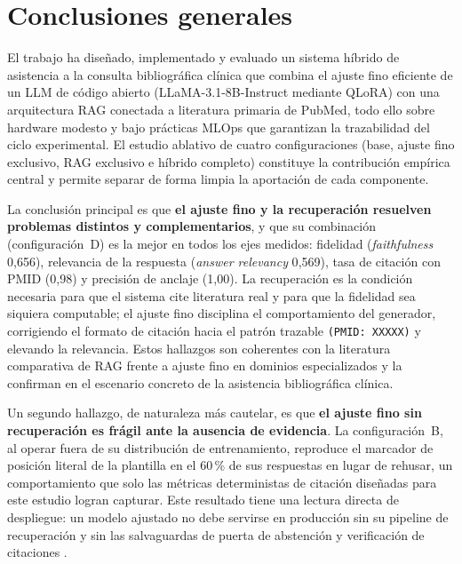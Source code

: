 \documentclass[11pt,a4paper,spanish]{book}
\numberwithin{equation}{chapter}
\numberwithin{figure}{chapter}
\begin{document}
\section{Conclusiones generales}
\label{sec:c7_conclusiones}

El trabajo ha diseñado, implementado y evaluado un sistema híbrido de asistencia a la consulta bibliográfica clínica que combina el ajuste fino eficiente de un LLM de código abierto (LLaMA-3.1-8B-Instruct mediante QLoRA) con una arquitectura RAG conectada a literatura primaria de PubMed, todo ello sobre hardware modesto y bajo prácticas MLOps que garantizan la trazabilidad del ciclo experimental. El estudio ablativo de cuatro configuraciones (base, ajuste fino exclusivo, RAG exclusivo e híbrido completo) constituye la contribución empírica central y permite separar de forma limpia la aportación de cada componente.

La conclusión principal es que \textbf{el ajuste fino y la recuperación resuelven problemas distintos y complementarios}, y que su combinación (configuración~D) es la mejor en todos los ejes medidos: fidelidad (\textit{faithfulness} 0{,}656), relevancia de la respuesta (\textit{answer relevancy} 0{,}569), tasa de citación con PMID (0{,}98) y precisión de anclaje (1{,}00). La recuperación es la condición necesaria para que el sistema cite literatura real y para que la fidelidad sea siquiera computable; el ajuste fino disciplina el comportamiento del generador, corrigiendo el formato de citación hacia el patrón trazable \texttt{(PMID:~XXXXX)} y elevando la relevancia. Estos hallazgos son coherentes con la literatura comparativa de RAG frente a ajuste fino en dominios especializados \cite{ovadia2024finetuningretrievalcomparingknowledge, balaguer2024ragvsfinetuningpipelines, pingua_medical_FT_vs_RAG_2025} y la confirman en el escenario concreto de la asistencia bibliográfica clínica.

Un segundo hallazgo, de naturaleza más cautelar, es que \textbf{el ajuste fino sin recuperación es frágil ante la ausencia de evidencia}. La configuración~B, al operar fuera de su distribución de entrenamiento, reproduce el marcador de posición literal de la plantilla en el 60\,\% de sus respuestas en lugar de rehusar, un comportamiento que solo las métricas deterministas de citación diseñadas para este estudio logran capturar. Este resultado tiene una lectura directa de despliegue: un modelo ajustado no debe servirse en producción sin su pipeline de recuperación y sin las salvaguardas de puerta de abstención y verificación de citaciones \cite{ji_survey_2023, pal_med-halt_2023}.
\end{document}
